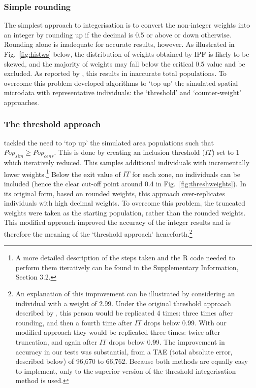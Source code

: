 \documentclass[a4paper, 11pt, twoside]{Thesis}
\begin{document}
\subsubsection{Simple rounding}
The simplest approach to integerisation is to convert the non-integer
weights into an integer by rounding up if 
the decimal is 0.5 or above or down otherwise.
Rounding alone is inadequate for accurate results, however. As illustrated in
Fig.~\ref{fig:histws} below, the distribution of weights obtained by IPF is
likely to be skewed, and the majority of weights may fall below the critical 0.5
value and be excluded. As reported by \citet[25]{Ballas2005c}, this results in
inaccurate total populations. To overcome this problem
\citet{Ballas2005c} developed algorithms to `top up' the simulated
spatial microdata with
representative individuals: the `threshold' and `counter-weight' approaches.

\subsubsection{The threshold approach}
\citet{Ballas2005c} tackled the need to `top up' the simulated area
populations such that $Pop_{sim} \geq Pop_{cens}$. This is done by creating an inclusion
threshold ($IT$) set to 1 which iteratively
reduced. This samples additional individuals with
incrementally lower weights.\footnote{A 
more detailed description of the steps
taken and the R code needed to perform them iteratively can be found in the
Supplementary Information, Section 3.2.}
Below the exit value of $IT$ for each zone, no individuals can be included
(hence the clear cut-off point around 0.4 in Fig.~\ref{fig:threshweights}).
In its original form, based on rounded weights, this approach over-replicates
individuals with high decimal weights.
To overcome this problem, the truncated weights were taken as the starting
population, rather than the rounded weights. This modified approach improved the
accuracy of the integer results and is therefore the meaning of
the `threshold approach' henceforth.\footnote{An
explanation of this improvement can be illustrated by considering an individual
with a weight of 2.99. Under the original threshold approach described by
\citet{Ballas2005c}, this person would be replicated 4 times: three times after
rounding, and then a
fourth time after $IT$ drops below 0.99. With our modified approach they would
be replicated three times: twice after truncation, and again after $IT$ drops
below 0.99. The improvement in accuracy in our tests was substantial, from a TAE
(total absolute error, described below) of 96,670 to 66,762. Because both
methods are equally easy to implement, only to the superior
version of the threshold integerisation
method is used.}
\end{document}
